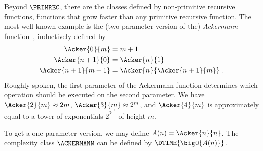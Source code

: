 \documentclass[../../diss.tex]{subfiles}
\begin{document}
Beyond $\PRIMREC$, there are the classes defined by non-primitive recursive functions, functions that grow faster than any primitive recursive function.
The most well-known example is the (two-parameter version of the) \emph{Ackermann} function~\cite{Ackermann28,Peter35}, inductively defined by
\begin{align*}
         \Acker{0}{m} &= m + 1 \\
         \Acker{n+1}{0} &= \Acker{n}{1}\\
         \Acker{n+1}{m+1} &= \Acker{n}{\Acker{n+1}{m}}\ .
\end{align*}
%
Roughly spoken, the first parameter of the Ackermann function determines which operation should be executed on the second parameter.
We have $\Acker{2}{m} \approx 2m$, $\Acker{3}{m} \approx 2^m$, and $\Acker{4}{m}$ is approximately equal to a tower of exponentials $2^{2^{\iddots^2}}$ of height $m$.

To get a one-parameter version, we may define $A(n) = \Acker{n}{n}$.
The complexity class $\ACKERMANN$ can be defined by $\DTIME{\bigO{A(n)}}$.
\end{document}
